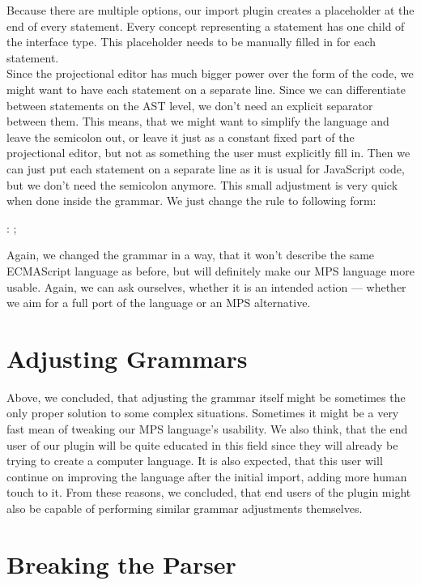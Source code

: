 Because there are multiple options, our import plugin creates a placeholder at the end of every statement.
Every concept representing a statement has one child of the  interface type.
This placeholder needs to be manually filled in for each statement.
\\

Since the projectional editor has much bigger power over the form of the code, we might want to have each statement on a separate line.
Since we can differentiate between statements on the AST level, we don't need an explicit separator between them.
This means, that we might want to simplify the language and leave the semicolon out, or leave it just as a constant fixed part of the projectional editor, but not as something the user must explicitly fill in.
Then we can just put each statement on a separate line as it is usual for JavaScript code, but we don't need the semicolon anymore.
This small adjustment is very quick when done inside the grammar.
We just change the  rule to following form:

\begin{antlr}
	 : \literal{;} ;
\end{antlr}

Again, we changed the grammar in a way, that it won't describe the same ECMAScript language as before, but will definitely make our MPS language more usable.
Again, we can ask ourselves, whether it is an intended action --- whether we aim for a full port of the language or an MPS alternative.

\section{Adjusting Grammars}
Above, we concluded, that adjusting the grammar itself might be sometimes the only proper solution to some complex situations.
Sometimes it might be a very fast mean of tweaking our MPS language's usability.
We also think, that the end user of our plugin will be quite educated in this field since they will already be trying to create a computer language.
It is also expected, that this user will continue on improving the language after the initial import, adding more human touch to it.
From these reasons, we concluded, that end users of the plugin might also be capable of performing similar grammar adjustments themselves.

\section{Breaking the Parser}
\label{chap:breaking_the_parser}


